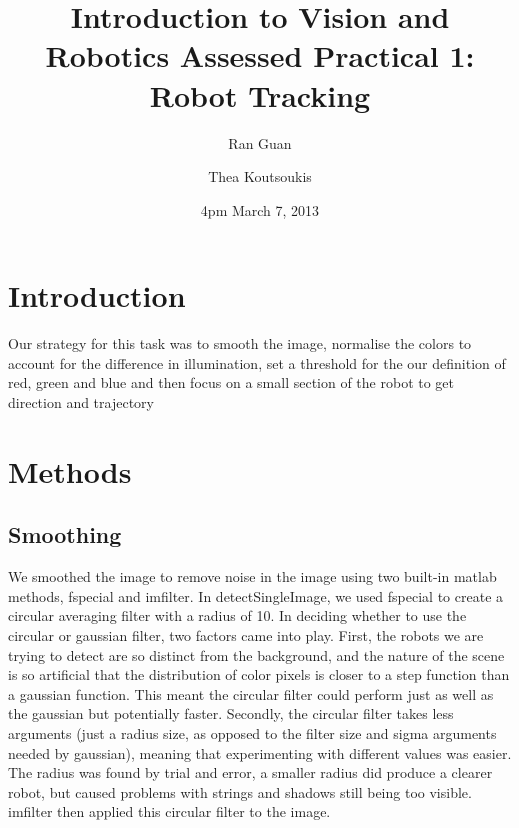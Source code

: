 \documentclass{report}
\title{\bf Introduction to Vision and Robotics Assessed Practical 1: Robot Tracking}  %
\author{
	Ran Guan\\
	\and
	Thea Koutsoukis\\            
}
\date{4pm March 7, 2013}
\begin{document}
\maketitle                              %
\setcounter{page}{2}                    %
\tableofcontents         
\renewcommand{\chaptername}{}           %

\chapter{Introduction}                	%
Our strategy for this task was to smooth the image, normalise the colors to account for the difference in illumination, set a threshold for the our definition of red, green and blue and then focus on a small section of the robot to get direction and trajectory
 
\chapter{Methods}                		
\section{Smoothing}                  	

We smoothed the image to remove noise in the image using two built-in matlab methods, fspecial and imfilter. In detectSingleImage, we used fspecial to create a circular averaging filter with a radius of 10. In deciding whether to use the circular or gaussian filter, two factors came into play. First, the robots we are trying to detect are so distinct from the background, and the nature of the scene is so artificial that the distribution of color pixels is closer to a step function than a gaussian function. This meant the circular filter could perform just as well as the gaussian but potentially faster. Secondly, the circular filter takes less arguments (just a radius size, as opposed to the filter size and sigma arguments needed by gaussian), meaning that experimenting with different values was easier. The radius was found by trial and error, a smaller radius did produce a clearer robot, but caused problems with strings and shadows still being too visible. imfilter then applied this circular filter to the image.
\end{document}
